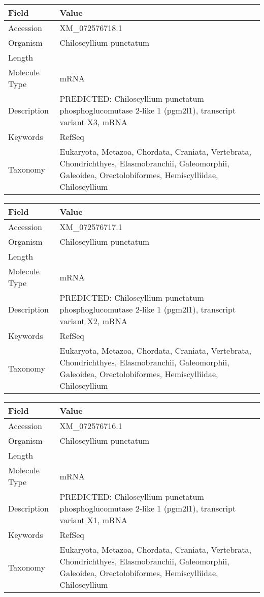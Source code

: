 \documentclass[10pt]{article}
\begin{document}
\vspace{1em}
{\footnotesize
\begin{longtable}{>{\raggedright\arraybackslash}p{4.5cm} >{\raggedright\arraybackslash}p{11.5cm}}
\textbf{Field} & \textbf{Value} \\
\hline
Accession & XM\_072576718.1 \\
Organism & Chiloscyllium punctatum \\
Length & 5733 \\
Molecule Type & mRNA \\
Description & PREDICTED: Chiloscyllium punctatum phosphoglucomutase 2-like 1 (pgm2l1), transcript variant X3, mRNA \\
Keywords & RefSeq \\
Taxonomy & Eukaryota, Metazoa, Chordata, Craniata, Vertebrata, Chondrichthyes, Elasmobranchii, Galeomorphii, Galeoidea, Orectolobiformes, Hemiscylliidae, Chiloscyllium \\
\end{longtable}
}

\vspace{1em}
{\footnotesize
\begin{longtable}{>{\raggedright\arraybackslash}p{4.5cm} >{\raggedright\arraybackslash}p{11.5cm}}
\textbf{Field} & \textbf{Value} \\
\hline
Accession & XM\_072576717.1 \\
Organism & Chiloscyllium punctatum \\
Length & 5940 \\
Molecule Type & mRNA \\
Description & PREDICTED: Chiloscyllium punctatum phosphoglucomutase 2-like 1 (pgm2l1), transcript variant X2, mRNA \\
Keywords & RefSeq \\
Taxonomy & Eukaryota, Metazoa, Chordata, Craniata, Vertebrata, Chondrichthyes, Elasmobranchii, Galeomorphii, Galeoidea, Orectolobiformes, Hemiscylliidae, Chiloscyllium \\
\end{longtable}
}

\vspace{1em}
{\footnotesize
\begin{longtable}{>{\raggedright\arraybackslash}p{4.5cm} >{\raggedright\arraybackslash}p{11.5cm}}
\textbf{Field} & \textbf{Value} \\
\hline
Accession & XM\_072576716.1 \\
Organism & Chiloscyllium punctatum \\
Length & 6028 \\
Molecule Type & mRNA \\
Description & PREDICTED: Chiloscyllium punctatum phosphoglucomutase 2-like 1 (pgm2l1), transcript variant X1, mRNA \\
Keywords & RefSeq \\
Taxonomy & Eukaryota, Metazoa, Chordata, Craniata, Vertebrata, Chondrichthyes, Elasmobranchii, Galeomorphii, Galeoidea, Orectolobiformes, Hemiscylliidae, Chiloscyllium \\
\end{longtable}
}
\end{document}
